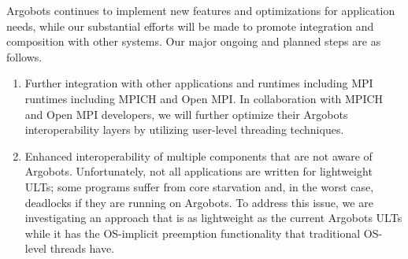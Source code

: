 Argobots continues to implement new features and optimizations for
application needs, while our substantial efforts will be made to
promote integration and composition with other systems. Our major
ongoing and planned steps are as follows.

\begin{enumerate}

\item Further integration with other applications and runtimes
including MPI runtimes including MPICH and Open MPI.  In collaboration
with MPICH and Open MPI developers, we will further optimize their
Argobots interoperability layers by utilizing user-level threading
techniques.

\item Enhanced interoperability of multiple components that are not
aware of Argobots.  Unfortunately, not all applications are written
for lightweight ULTs; some programs suffer from core starvation and,
in the worst case, deadlocks if they are running on Argobots.  To
address this issue, we are investigating an approach that is as
lightweight as the current Argobots ULTs while it has the OS-implicit
preemption functionality that traditional OS-level threads have.

\end{enumerate}
